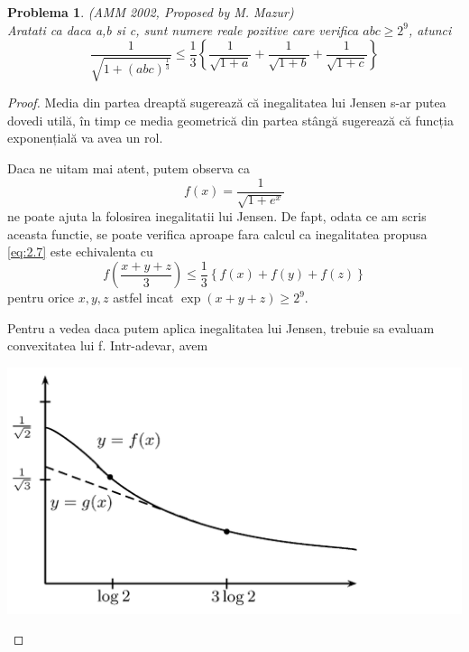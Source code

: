\documentclass[a4paper,12pt,oneside]{report}
\newtheorem{problem}{Problema}
\begin{document}
\begin{problem}(AMM 2002, Proposed by M. Mazur)\\
Aratati ca daca a,b si c, sunt numere reale pozitive care verifica \(abc \geq 2^{9}\), atunci
\begin{displaymath}
  \frac{1}{\sqrt{1 + \left ( abc \right )^{\frac{1}{3}}}}\leq \frac{1}{3}\left \{ \frac{1}{\sqrt{1 + a}} + \frac{1}{\sqrt{1 + b}} + \frac{1}{\sqrt{1 + c}}\right \}    	
  \label{eq:2.7} \tag{2.7}
\end{displaymath}
\end{problem}
\begin{proof}
Media din partea dreaptă sugerează că inegalitatea lui Jensen s-ar putea dovedi utilă, în timp ce media geometrică din partea stângă sugerează că funcția exponențială va avea un rol.

Daca ne uitam mai atent, putem observa ca
\begin{displaymath}
  f\left ( x \right ) = \frac{1}{\sqrt{1+ e^{x}}}
\end{displaymath}
ne poate ajuta la folosirea inegalitatii lui Jensen. De fapt, odata ce am scris aceasta functie, se poate verifica aproape fara calcul ca inegalitatea propusa \ref{eq:2.7} este echivalenta cu
\begin{displaymath}
  f\left ( \frac{x + y + z}{3} \right )\leq \frac{1}{3}\left \{ f\left ( x \right ) + f\left ( y \right ) + f\left ( z \right ) \right \}    \label{eq:2.8} \tag{2.8}
\end{displaymath}
pentru orice $x, y, z$ astfel incat \(\exp\left ( x + y + z \right )\geq 2^{9}.\)

Pentru a vedea daca putem aplica inegalitatea lui Jensen, trebuie sa evaluam convexitatea lui f. Intr-adevar, avem

\begin{center}
	\includegraphics[width=1.0\textwidth]{fig_pb3.png}
\end{center}


\end{proof}
\end{document}
